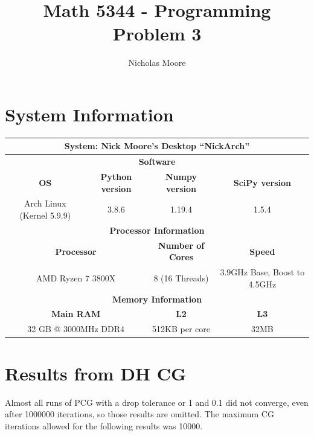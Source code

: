 \documentclass[oneside,final]{amsart}  %
\title{Math 5344 - Programming Problem 3}
\author{Nicholas Moore}
\begin{document}
\maketitle
\section{System Information}
  \begin{table}[htpb]
    \centering
    \begin{tabular}{|c|c|c|c|}
      \hline
      \multicolumn{4}{|c|}{\textbf{System: }Nick Moore's Desktop ``NickArch'' }\\
      \hline
      \hline
      \multicolumn{4}{|c|}{\textbf{Software}} \\
      \hline
      \textbf{OS} & \textbf{Python version} & \textbf{Numpy version} & \textbf{SciPy version} \\
      \hline
      Arch Linux (Kernel 5.9.9) & 3.8.6 & 1.19.4 & 1.5.4 \\
      \hline
      \multicolumn{4}{|c|}{\textbf{Processor Information}} \\
      \hline
      \multicolumn{2}{|c|}{\textbf{Processor}} & \textbf{Number of Cores} & \textbf{Speed} \\
      \hline
      \multicolumn{2}{|c|}{AMD Ryzen 7 3800X} & 8 (16 Threads) & 3.9GHz Base, Boost to 4.5GHz \\
      \hline
      \multicolumn{4}{|c|}{\textbf{Memory Information}} \\
      \hline
      \multicolumn{2}{|c|}{\textbf{Main RAM}} & \textbf{L2} & \textbf{L3} \\
      \hline
      \multicolumn{2}{|c|}{32 GB @ 3000MHz DDR4} & 512KB  per core & 32MB \\
      \hline
    \end{tabular}
  \end{table}
\section{Results from DH CG}

Almost all runs of PCG with a drop tolerance or 1 and 0.1 did not converge, even
after 1000000 iterations, so those results are omitted.  The maximum CG iterations allowed for the
following results was 10000.
\end{document}
